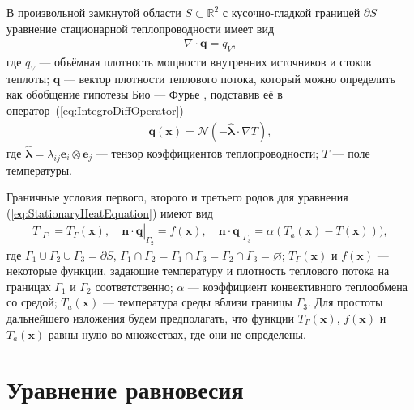 В произвольной замкнутой области $S \subset \mathbb{R}^2$ с кусочно-гладкой границей $\partial S$ уравнение стационарной теплопроводности имеет вид \cite{MSS}
\begin{gather}
	\label{eq:StationaryHeatEquation}
	\nabla \cdot \boldsymbol{q} = q_V,
\end{gather}
где $q_V$ --- объёмная плотность мощности внутренних источников и стоков теплоты;
$\boldsymbol{q}$ --- вектор плотности теплового потока, который можно определить как обобщение гипотезы Био --- Фурье \cite{ThermoViscoElasticity1, ThermoViscoElasticity2, ThermoViscoElasticity3}, подставив её в \mbox{оператор~(\ref{eq:IntegroDiffOperator})}
\begin{gather}
	\label{eq:BiotFourier}
	\boldsymbol{q}(\boldsymbol{x}) = 
	\mathcal{N} \left( -\widehat{\boldsymbol{\lambda}} \cdot \nabla T \right),
\end{gather}
где $\widehat{\boldsymbol{\lambda}} = \lambda_{ij} \boldsymbol{e}_i \otimes \boldsymbol{e}_j$ --- тензор коэффициентов теплопроводности;
$T$ --- поле температуры.

Граничные условия первого, второго и третьего родов для уравнения (\ref{eq:StationaryHeatEquation}) имеют вид
\begin{gather}
	\label{eq:ThermalBoundaries}
	T|_{\Gamma_1} = T_{\Gamma} (\boldsymbol{x}),
	\quad
	\boldsymbol{n} \cdot \boldsymbol{q}|_{\Gamma_2} = f(\boldsymbol{x}),
	\quad
	\boldsymbol{n} \cdot \boldsymbol{q}|_{\Gamma_3} = \alpha (T_a(\boldsymbol{x}) - T(\boldsymbol{x}))),
\end{gather}
где $\Gamma_1 \cup \Gamma_2 \cup \Gamma_3 = \partial S$, $\Gamma_1 \cap \Gamma_2 = \Gamma_1 \cap \Gamma_3 = \Gamma_2 \cap \Gamma_3 = \varnothing$;
$T_{\Gamma} (\boldsymbol{x})$ и $f(\boldsymbol{x})$ --- некоторые функции, задающие температуру и плотность теплового потока на границах $\Gamma_1$ и $\Gamma_2$ соответственно;
$\alpha$ --- коэффициент конвективного теплообмена со средой;
$T_a (\boldsymbol{x})$ --- температура среды вблизи границы $\Gamma_3$.
Для простоты дальнейшего изложения будем предполагать, что функции $T_{\Gamma}(\boldsymbol{x})$, $f(\boldsymbol{x})$ и $T_a(\boldsymbol{x})$ равны нулю во множествах, где они не определены.

\section{Уравнение равновесия}\label{sec:BasicRelations/EquilibriumEquation}

